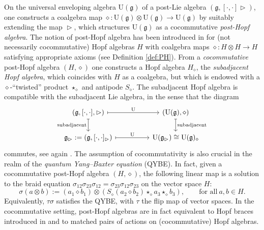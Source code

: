 \documentclass[10pt]{article}
\theoremstyle{definition}
\newcommand{\wt}{\vartriangleright}
\renewcommand{\wp}{\diamond}
\newcommand{\ot}{\otimes}
\begin{document}
On the universal enveloping algebra $\mathrm{U}(\mathfrak{g})$ of a post-Lie algebra $(\mathfrak{g},[\cdot,\cdot]\wt)$, one constructs a coalgebra map $\wp\colon\mathrm{U}(\mathfrak{g})\otimes\mathrm{U}(\mathfrak{g})\to\mathrm{U}(\mathfrak{g})$ by suitably extending the map $\wt$, which structures $\mathrm{U}(\mathfrak{g})$ as a cocommutative \emph{post-Hopf algebra}. The notion of post-Hopf algebra has been introduced in \cite{LST} for (not necessarily cocommutative) Hopf algebras $H$ with coalgebra maps $\wp\colon H\otimes H\to H$ satisfying appropriate axioms (see Definition \ref{def:PH}). From a \textit{cocommutative} post-Hopf algebra $(H,\wp)$ one constructs a Hopf algebra $H_{\wp}$, the \emph{subadjacent Hopf algebra}, which coincides with $H$ as a coalgebra, but which is endowed with a $\wp$-``twisted'' product $\star_\wp$ and antipode $S_\wp$. The subadjacent Hopf algebra is compatible with the subadjacent Lie algebra, in the sense that the diagram
	\begin{equation*}
	\begin{tikzcd}
		(\mathfrak{g},[\cdot,\cdot],\wt) \arrow[rr, maps to, "\mathrm{U}"] \arrow[d, maps to, swap, "\text{subadjacent}"] & & (\mathrm{U}(\mathfrak{g}),\wp) \arrow[d, maps to, "\text{subadjacent}"]\\
		\mathfrak{g}_{\wt}:=(\mathfrak{g},[\cdot,\cdot]_{\wt}) \arrow[rr, maps to, "\mathrm{U}"] & & \mathrm{U}(\mathfrak{g}_{\wt})\cong\mathrm{U}(\mathfrak{g})_{\wp}
	\end{tikzcd}
	\end{equation*}
	commutes, see again \cite{LST}. The assumption of cocommutativity is also crucial in the realm of the \textit{quantum Yang--Baxter equation} (QYBE). In fact, given a cocommutative post-Hopf algebra $(H,\wp)$, the following linear map is a solution to the braid equation $\sigma_{12}\sigma_{23}\sigma_{12}=\sigma_{23}\sigma_{12}\sigma_{23}$ on the vector space $H$:
\begin{equation}
\sigma(a\ot b):=(a_{1}\wp b_{1})\ot(S_{\wp}(a_{2}\wp b_{2})\star_{\wp}a_{3}\star_{\wp}b_{3}),\qquad \text{for all}\ a,b\in H.
\end{equation}
Equivalently, $\tau\sigma$ satisfies the QYBE, with $\tau$ the flip map of vector spaces. In the cocommutative setting, post-Hopf algebras are in fact equivalent to Hopf braces introduced in \cite{AGV} and to matched pairs of actions on (cocommutative) Hopf algebras. 
\end{document}
